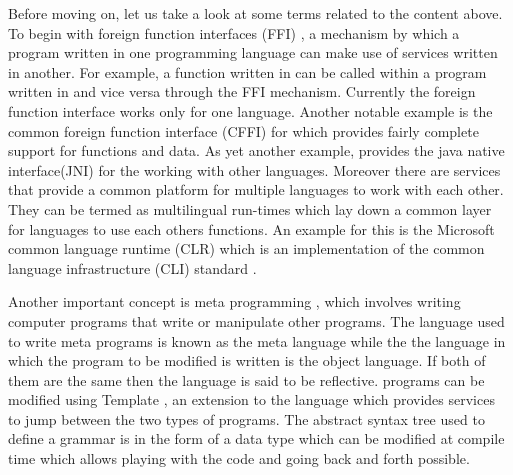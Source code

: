\documentclass[thesis-solanki.tex]{subfiles}
\begin{document}
Before moving on, let us take a look at some terms related to the content above.
To begin with foreign function interfaces (FFI) \cite{website:ffiwiki}, a mechanism by which a program written in
one programming language can make use of services written in another.
For example, a function written in  can be called within a program written in  and
vice versa through the FFI mechanism.
Currently the  foreign function interface works only for one language.
Another notable example is the common foreign function interface (CFFI) \cite{website:commonlisp} for
 which provides fairly complete support for  functions and data.
As yet another example,
 provides the java native interface(JNI) for the working with other languages.
Moreover there are services that provide a common platform for multiple languages to work with each other. 
They can be termed as multilingual run-times
which lay down a common layer for languages to use each others
functions.
An example for this is the Microsoft common language runtime (CLR) \cite{website:clrwiki} which is an
implementation of the common language infrastructure (CLI) standard \cite{website:cliwiki}.

Another important concept is meta programming \cite{website:metaprogwiki}, which involves writing computer programs
that write or manipulate other programs.
The language used to write meta programs is known as the meta language while the the language in which the program
to be modified is written is the object language.
If both of them are the same then the language is said to be reflective.
 programs can be modified using Template  \cite{website:templatehaskell}, an
extension to the language which provides services to jump between the two types of programs.
The abstract syntax tree used to define a grammar is in the form of a  data type which can be
modified at compile time which allows playing with the code and going back and forth possible.
\end{document}
